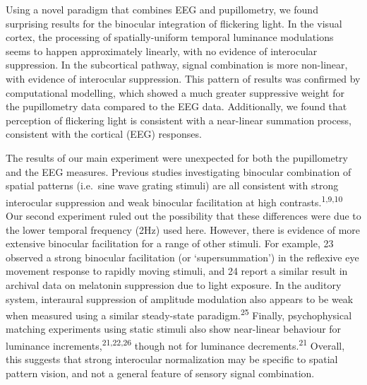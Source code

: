 \documentclass[
]{article}
\begin{document}
Using a novel paradigm that combines EEG and pupillometry, we found surprising results for the binocular integration of flickering light. In the visual cortex, the processing of spatially-uniform temporal luminance modulations seems to happen approximately linearly, with no evidence of interocular suppression. In the subcortical pathway, signal combination is more non-linear, with evidence of interocular suppression. This pattern of results was confirmed by computational modelling, which showed a much greater suppressive weight for the pupillometry data compared to the EEG data. Additionally, we found that perception of flickering light is consistent with a near-linear summation process, consistent with the cortical (EEG) responses.

The results of our main experiment were unexpected for both the pupillometry and the EEG measures. Previous studies investigating binocular combination of spatial patterns (i.e.~sine wave grating stimuli) are all consistent with strong interocular suppression and weak binocular facilitation at high contrasts.\textsuperscript{1,9,10} Our second experiment ruled out the possibility that these differences were due to the lower temporal frequency (2Hz) used here. However, there is evidence of more extensive binocular facilitation for a range of other stimuli. For example, 23 observed a strong binocular facilitation (or `supersummation') in the reflexive eye movement response to rapidly moving stimuli, and 24 report a similar result in archival data on melatonin suppression due to light exposure. In the auditory system, interaural suppression of amplitude modulation also appears to be weak when measured using a similar steady-state paradigm.\textsuperscript{25} Finally, psychophysical matching experiments using static stimuli also show near-linear behaviour for luminance increments,\textsuperscript{21,22,26} though not for luminance decrements.\textsuperscript{21} Overall, this suggests that strong interocular normalization may be specific to spatial pattern vision, and not a general feature of sensory signal combination.
\end{document}
